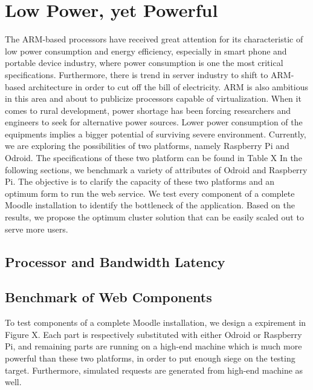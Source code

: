 \chapter{Low Power, yet Powerful}\label{benchmark}
The ARM-based processors have received great attention for its characteristic of low power consumption and energy efficiency, especially in smart phone and portable device industry, where power consumption is one the most critical specifications. Furthermore, there is trend in server industry to shift to ARM-based architecture in order to cut off the bill of electricity. ARM is also ambitious in this area and about to publicize processors capable of virtualization. When it comes to rural development, power shortage has been forcing researchers and engineers to seek for alternative power sources. Lower power consumption of the equipments implies a bigger potential of surviving severe environment.
Currently, we are exploring the possibilities of two platforms, namely Raspberry Pi and Odroid. The specifications of these two platform can be found in Table X
In the following sections, we benchmark a variety of attributes of Odroid and Raspberry Pi. The objective is to clarify the capacity of these two platforms and an optimum form to run the web service. We test every component of a complete Moodle installation to identify the bottleneck of the application. Based on the results, we propose the optimum cluster solution that can be easily scaled out to serve more users.

\section{Processor and Bandwidth Latency}


\section{Benchmark of Web Components}
To test components of a complete Moodle installation, we design a expirement in Figure X. Each part is respectively substituted with either Odroid or Raspberry Pi, and remaining parts are running on a high-end machine which is much more powerful than these two platforms, in order to put enough siege on the testing target. Furthermore, simulated requests are generated from high-end machine as well.

